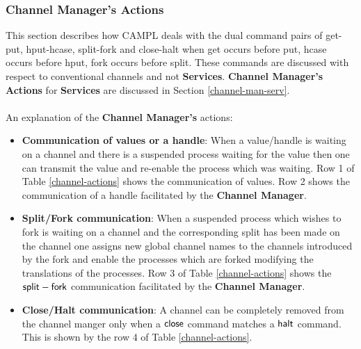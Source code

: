 \documentclass[11pt]{article}
\newcommand{\<}{\langle}
\renewcommand{\>}{\rangle}
\begin{document}
\subsubsection{Channel Manager's Actions}{\label{channel-manager}} \label{ChanManAct}
This section describes how CAMPL deals with the dual command pairs of {\sf get-put}, {\sf hput-hcase}, {\sf split-fork} and {\sf close-halt} when {\sf get} occurs before {\sf put}, {\sf hcase} occurs before {\sf hput}, {\sf fork} occurs before {\sf split}. These commands are discussed with respect to conventional channels and not {\bf Services}. {\bf Channel Manager's Actions} for {\bf Services} are discussed in Section \ref {channel-man-serv}.
~~\\~~\\
An explanation of the {\bf Channel Manager's} actions:
\begin{itemize}
  \item {\bf Communication of values or a handle}:
When a value/handle is waiting on a channel and there is a suspended process waiting for the value then one can transmit the value and re-enable the process which was waiting. Row 1 of Table \ref {channel-actions} shows the communication of {\sf values}. Row 2 shows the communication of a {\sf handle} facilitated by the {\bf Channel Manager}.

\item {\bf Split/Fork communication}:
When a suspended process which wishes to fork is waiting on a channel and the corresponding split has been made on the channel one assigns new global channel names to the channels introduced by the fork and enable the processes which are forked modifying the translations of the processes. Row 3 of Table \ref {channel-actions} shows the ${\sf split-fork}$ communication facilitated by the {\bf Channel Manager}.

\item {\bf Close/Halt communication}:
A channel can be completely removed from the channel manger only when a ${\sf close}$ command matches a ${\sf halt}$ command. This is shown by the row 4 of Table \ref {channel-actions}.
\end{itemize}
\end{document}
